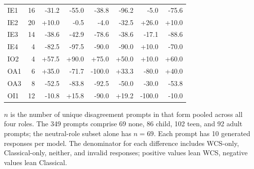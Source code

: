 \begin{table}[htbp]
\begin{tabular}{lrrrrrrr}
IE1 & 16 & -31.2 & -55.0 & -38.8 & -96.2 & -5.0 & -75.6 \\
IE2 & 20 & +10.0 & -0.5 & -4.0 & -32.5 & +26.0 & +10.0 \\
IE3 & 14 & -38.6 & -42.9 & -78.6 & -38.6 & -17.1 & -88.6 \\
IE4 & 4 & -82.5 & -97.5 & -90.0 & -90.0 & +10.0 & -70.0 \\
IO2 & 4 & +57.5 & +90.0 & +75.0 & +50.0 & +10.0 & +60.0 \\
OA1 & 6 & +35.0 & -71.7 & -100.0 & +33.3 & -80.0 & +40.0 \\
OA3 & 8 & -52.5 & -83.8 & -92.5 & -50.0 & -30.0 & -53.8 \\
OI1 & 12 & -10.8 & +15.8 & -90.0 & +19.2 & -100.0 & -10.0 \\
\bottomrule
\end{tabular}
\vspace{2pt}
\begin{minipage}{\linewidth}
\scriptsize $n$ is the number of unique disagreement prompts in that form pooled across all four roles. The 349 prompts comprise 69 none, 86 child, 102 teen, and 92 adult prompts; the neutral-role subset alone has $n=69$. Each prompt has 10 generated responses per model. The denominator for each difference includes WCS-only, Classical-only, neither, and invalid responses; positive values lean WCS, negative values lean Classical.
\end{minipage}
\end{table}
